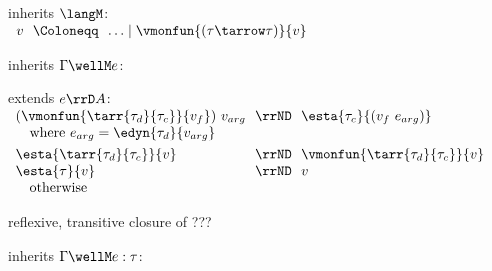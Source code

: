 \begin{flushleft}

\begin{minipage}[t]{\columnwidth}
 inherits $\langM$:\\
$\begin{array}{l@{~~}c@{~~}l}
  v & \Coloneqq & \ldots \mid \vmonfun{(\tau\tarrow\tau)}{v}
\end{array}$

\medskip
{} inherits $\Gamma \wellM e$:\\
\begin{mathpar}
\end{mathpar}

\medskip
{} extends $e \rrD A$:\\
$\begin{array}{l@{~~}c@{~~}l}
  (\vmonfun{\tarr{\tau_d}{\tau_c}}{v_f})~v_{arg} & \rrND & \esta{\tau_c}{(v_f~e_{arg})}
\\ \multicolumn{3}{l}{\mbox{\quad where $e_{arg} = \edyn{\tau_d}{v_{arg}}$}}
\\[0.8ex]
  \esta{\tarr{\tau_d}{\tau_c}}{v} & \rrND & \vmonfun{\tarr{\tau_d}{\tau_c}}{v}
\\
  \esta{\tau}{v} & \rrND & v
\\ \multicolumn{3}{l}{\mbox{\quad otherwise}}
\end{array}$

\medskip
{} reflexive, transitive closure of ??? %
\end{minipage}%
\begin{minipage}[t]{\columnwidth}
 inherits $\Gamma \wellM e : \tau$:
\begin{mathpar}
\end{mathpar}


\end{minipage}
\end{flushleft}

